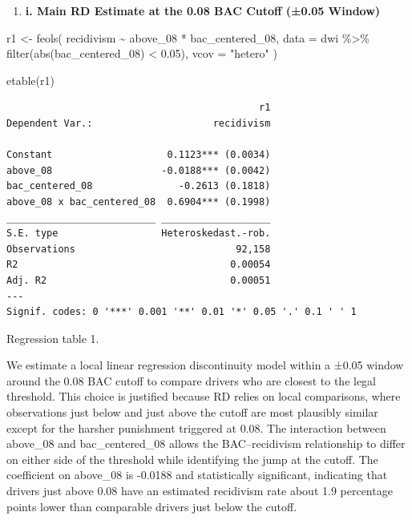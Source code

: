 \documentclass[
  letterpaper,
  DIV=11,
  numbers=noendperiod]{scrartcl}
\newenvironment{Shaded}{\begin{snugshade}}{\end{snugshade}}
\newcommand{\AttributeTok}[1]{\textcolor[rgb]{0.40,0.45,0.13}{#1}}
\newcommand{\FloatTok}[1]{\textcolor[rgb]{0.68,0.00,0.00}{#1}}
\newcommand{\FunctionTok}[1]{\textcolor[rgb]{0.28,0.35,0.67}{#1}}
\newcommand{\NormalTok}[1]{\textcolor[rgb]{0.00,0.23,0.31}{#1}}
\newcommand{\OtherTok}[1]{\textcolor[rgb]{0.00,0.23,0.31}{#1}}
\newcommand{\SpecialCharTok}[1]{\textcolor[rgb]{0.37,0.37,0.37}{#1}}
\newcommand{\StringTok}[1]{\textcolor[rgb]{0.13,0.47,0.30}{#1}}
\providecommand{\tightlist}{%
  \setlength{\itemsep}{0pt}\setlength{\parskip}{0pt}}
\begin{document}
\begin{enumerate}
\def\labelenumi{\arabic{enumi}.}
\setcounter{enumi}{6}
\tightlist
\item
  \textbf{i. Main RD Estimate at the 0.08 BAC Cutoff (±0.05 Window)}
\end{enumerate}

\begin{Shaded}
\begin{Highlighting}[]
\NormalTok{r1 }\OtherTok{\textless{}{-}} \FunctionTok{feols}\NormalTok{(}
\NormalTok{  recidivism }\SpecialCharTok{\textasciitilde{}}\NormalTok{ above\_08 }\SpecialCharTok{*}\NormalTok{ bac\_centered\_08,}
  \AttributeTok{data =}\NormalTok{ dwi }\SpecialCharTok{\%\textgreater{}\%} \FunctionTok{filter}\NormalTok{(}\FunctionTok{abs}\NormalTok{(bac\_centered\_08) }\SpecialCharTok{\textless{}} \FloatTok{0.05}\NormalTok{),}
  \AttributeTok{vcov =} \StringTok{"hetero"}
\NormalTok{)}

\FunctionTok{etable}\NormalTok{(r1)}
\end{Highlighting}
\end{Shaded}

\begin{verbatim}
                                            r1
Dependent Var.:                     recidivism
                                              
Constant                    0.1123*** (0.0034)
above_08                   -0.0188*** (0.0042)
bac_centered_08               -0.2613 (0.1818)
above_08 x bac_centered_08  0.6904*** (0.1998)
__________________________ ___________________
S.E. type                  Heteroskedast.-rob.
Observations                            92,158
R2                                     0.00054
Adj. R2                                0.00051
---
Signif. codes: 0 '***' 0.001 '**' 0.01 '*' 0.05 '.' 0.1 ' ' 1
\end{verbatim}

Regression table 1.

We estimate a local linear regression discontinuity model within a ±0.05
window around the 0.08 BAC cutoff to compare drivers who are closest to
the legal threshold. This choice is justified because RD relies on local
comparisons, where observations just below and just above the cutoff are
most plausibly similar except for the harsher punishment triggered at
0.08. The interaction between above\_08 and bac\_centered\_08 allows the
BAC--recidivism relationship to differ on either side of the threshold
while identifying the jump at the cutoff. The coefficient on above\_08
is -0.0188 and statistically significant, indicating that drivers just
above 0.08 have an estimated recidivism rate about 1.9 percentage points
lower than comparable drivers just below the cutoff.
\end{document}
